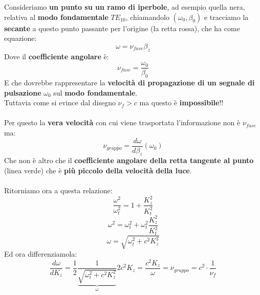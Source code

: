 Consideriamo \textbf{un punto su un ramo di iperbole}, ad esempio quella nera, relativa al \textbf{modo fondamentale} $TE_{10}$, chiamandolo $(\omega_0, \beta_0)$ e tracciamo la \textbf{secante} a questo punto passante per l'origine (la retta rossa), che ha come equazione:
\begin{equation*}
    \omega = \nu_{fase} \beta_z
\end{equation*}
Dove il \textbf{coefficiente angolare} è:
\begin{equation*}
    \nu_{fase} = \frac{\omega_0}{\beta_0}
\end{equation*}
E che dovrebbe rappresentare la \textbf{velocità di propagazione di un segnale di pulsazione} $\omega_0$ sul \textbf{modo fondamentale}.\\ 
Tuttavia come si evince dal disegno $\nu_f > c$ ma questo è \textbf{impossibile}!!\\ \\
Per questo la \textbf{vera velocità} con cui viene trasportata l'informazione non è $\nu_{fase}$ ma:
\begin{equation*}
    \nu_{gruppo} = \frac{d \omega}{d \beta_z}\left(\omega_0 \right)
\end{equation*}
Che non è altro che il \textbf{coefficiente angolare della retta tangente al punto} (linea verde) che è \textbf{più piccolo della velocità della luce}.\\ \\
Ritorniamo ora a questa relazione:
\begin{equation*}
    \frac{\omega^2}{\omega^2_t} = 1 + \frac{K^2_z}{K_t^2}
\end{equation*}
\begin{equation*}
    \omega^2 = \omega^2_t + \omega^2_t \frac{K^2_z}{K_t^2}
\end{equation*}
\begin{equation*}
    \omega = \sqrt{\omega^2_t + c^2 K^2_z}
\end{equation*}
Ed ora differenziamola:
\begin{equation*}
    \frac{d \omega}{d K_z} = \frac{1}{2} \frac{1}{\underbrace{\sqrt{\omega^2_t + c^2 K^2_z}}_{\omega}} 2 c^2 K_z = \frac{c^2 K_z}{\omega} = \nu_{gruppo} = c^2 \cdot \frac{1}{\nu_f}
\end{equation*}
